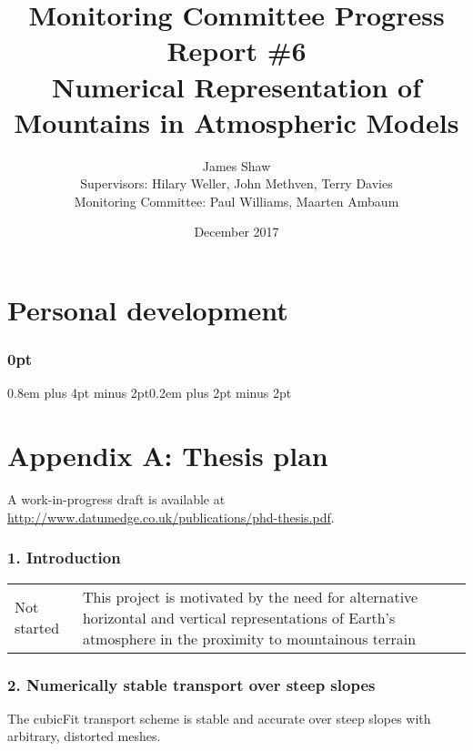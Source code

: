 \documentclass[a4paper,11pt]{article}
\title{
\vspace*{-2em}
Monitoring Committee Progress Report \#6\\
\vspace*{1em}
\Large{Numerical Representation of Mountains in Atmospheric Models}}
\author{James Shaw
\vspace{0.5em} \\
\large{Supervisors: Hilary Weller, John Methven, Terry Davies}
\vspace{0.5em} \\
\large{Monitoring Committee: Paul Williams, Maarten Ambaum}}
\date{December 2017}
\begin{document}
\maketitle

\section{Personal development}


\nocite{*}

                                                 


\newpage

\titlespacing\subsubsection{0pt}{0.8em plus 4pt minus 2pt}{0.2em plus 2pt minus 2pt}

\section*{Appendix A: Thesis plan}
\footnotesize
A work-in-progress draft is available at \url{http://www.datumedge.co.uk/publications/phd-thesis.pdf}.

\subsubsection*{1. Introduction}
\begin{tabularx}{\linewidth}{>{\hsize=0.9in}X X}
Not started & This project is motivated by the need for alternative horizontal and vertical representations of Earth's atmosphere in the proximity to mountainous terrain
\end{tabularx}

\subsubsection*{2. Numerically stable transport over steep slopes}
\noindent The cubicFit transport scheme is stable and accurate over steep slopes with arbitrary, distorted meshes.
\vspace*{0.5em}
\end{document}

